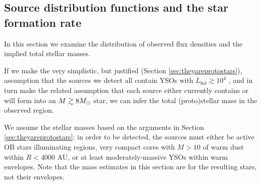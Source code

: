 \documentclass[twocolumn]{aastex61}
\begin{document}
\subsection{Source distribution functions and the star formation rate}
\label{sec:distributionsandsfr}

In this section we examine the distribution of observed flux densities and the
implied total stellar masses.  


If we make the very simplistic, but justified (Section
\ref{sec:theyareprotostars}), assumption that the sources we detect all contain
YSOs with $L_{bol}\gtrsim10^4$ \lsun, and in turn make the related
assumption that each source either currently contains or will form into an
$M\gtrsim8 M_{\odot}$ star, we can infer the total (proto)stellar mass in the
observed region.


We assume the stellar masses based on the arguments in Section
\ref{sec:theyareprotostars}: in order to be detected, the sources must either
be active OB stars illuminating \hii regions, very compact cores with $M>10$
\msun of warm dust within $R<4000$ AU, or at least moderately-massive YSOs
within warm envelopes.  Note that the mass estimates in this section are for
the resulting stars, not their envelopes.  

\end{document}
